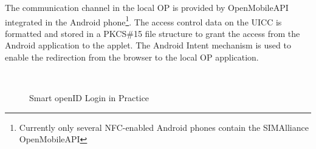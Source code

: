 \documentclass[runningheads,a4paper]{llncs}
\begin{document}
The communication channel in the local OP is provided by OpenMobileAPI integrated in the Android phone\footnote{Currently only several NFC-enabled Android phones contain the SIMAlliance OpenMobileAPI}. 
The access control data on the UICC is formatted and stored in a PKCS\#15 file structure to grant the access from the Android application to the applet. 
The Android Intent mechanism is used to enable the redirection from the browser to the local OP application.

\begin{figure}[t]
    \newlength{\SC}
    \setlength{\SC}{0.33\textwidth}
	\centering
	\quad
	 \quad
	 \quad
	 \\
	 \quad
	\quad
	\caption{Smart openID Login in Practice}
	\label{fig:demoscreen}
\end{figure}
\end{document}
